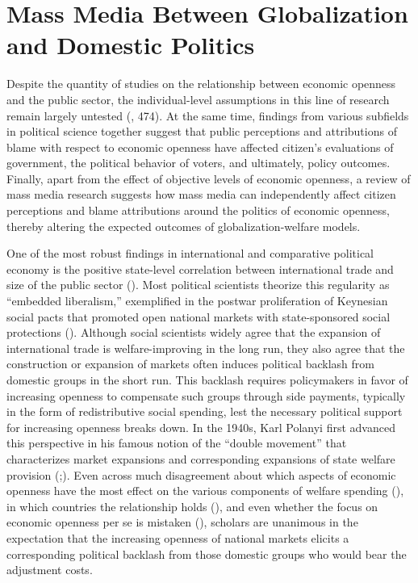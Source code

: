 \documentclass[12pt]{report}
\begin{document}
\section{Mass Media Between Globalization and Domestic Politics}

Despite the quantity of studies on the relationship between economic openness and the public sector,
the individual-level assumptions in this line of research remain largely untested
(\citealt{Hays:2005vo}, 474). At the same time, findings from various subfields in political science
together suggest that public perceptions and attributions of blame with respect to economic openness
have affected citizen's evaluations of government, the political behavior of voters, and ultimately,
policy outcomes. Finally, apart from the effect of objective levels of economic openness, a review
of mass media research suggests how mass media can independently affect citizen perceptions and
blame attributions around the politics of economic openness, thereby altering the expected outcomes
of globalization-welfare models.

One of the most robust findings in international and comparative political economy is the positive
state-level correlation between international trade and size of the public sector
(\citealt{Cameron:1978vb,Rodrik:1998te,Garrett:1995tj,Adsera:2002vt}). Most political scientists
theorize this regularity as ``embedded liberalism,'' exemplified in the postwar
proliferation of Keynesian social pacts that promoted open national markets with state-sponsored
social protections (\citealt{Ruggie:1982wx}). Although social scientists widely agree that the
expansion of international trade is welfare-improving in the long run, they also agree that the
construction or expansion of markets often induces political backlash from domestic groups in the
short run. This backlash requires policymakers in favor of increasing openness to compensate such
groups through side payments, typically in the form of redistributive social spending, lest the
necessary political support for increasing openness breaks down. In the 1940s, Karl Polanyi first
advanced this perspective in his famous notion of the ``double movement'' that
characterizes market expansions and corresponding expansions of state welfare provision
(\citealt[79, 385]{Polanyi:2001vc};). Even across much disagreement about which aspects of economic
openness have the most effect on the various components of welfare spending
(\citealt{Mares:2004el,Ansell:2008wl,Burgoon:2001dp}), in which countries the relationship holds
(\citealt{Rudra:2002ui}), and even whether the focus on economic openness per se is
mistaken (\citealt{Kim:2007wu,Oatley:2011hv}), scholars are unanimous in the expectation that the
increasing openness of national markets elicits a corresponding political backlash from those
domestic groups who would bear the adjustment costs.
\end{document}
